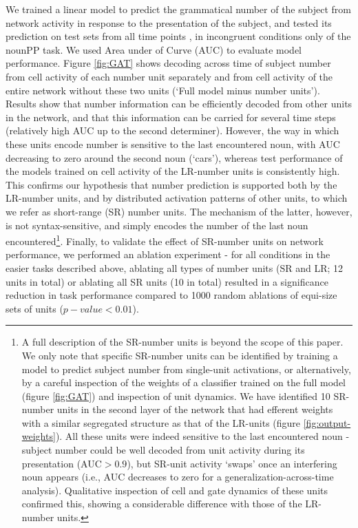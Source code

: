 We trained a linear model to predict the grammatical number of the
subject from network activity in response to the presentation of the
subject, and tested its prediction on test sets from all time points
, in incongruent conditions
only of the nounPP task. We used Area under of Curve (AUC) to evaluate model
performance. Figure \ref{fig:GAT} shows decoding across time of
subject number from cell activity of each number unit separately and
from cell activity of the entire network without these two units
(`Full model minus number units'). Results show that number
information can be efficiently decoded from other units in the
network, and that this information can be carried for several time
steps (relatively high AUC up to the second determiner). However, the
way in which these units encode number is sensitive to the last
encountered noun, with AUC decreasing to zero around the second noun
(`cars'), whereas test performance of the models trained on cell activity of the LR-number units is consistently high. This confirms our
hypothesis that number prediction is supported both by the LR-number
units, and by distributed activation patterns of other units, to which we refer as short-range (SR) number units. The
mechanism of the latter, however, is not syntax-sensitive, and simply encodes
the number of the last noun encountered\footnote{A full description of the SR-number units is beyond the scope of this paper. We only note that specific SR-number units can be identified by training a model to predict subject number from single-unit activations, or alternatively, by a careful inspection of the weights of a classifier trained on the full model (figure \ref{fig:GAT}) and inspection of unit dynamics. We have identified 10 SR-number units in the second layer of the network that had efferent weights with a similar segregated structure as that of the LR-units (figure \ref{fig:output-weights}). All these units were indeed sensitive to the last encountered noun - subject number could be well decoded from unit activity during its presentation (AUC$>0.9$), but SR-unit activity `swaps' once an interfering noun appears (i.e., AUC decreases to zero for a generalization-across-time analysis). Qualitative inspection of cell and gate dynamics of these units confirmed this, showing a considerable difference with those of the LR-number units.}. Finally, to validate the effect of SR-number units on network performance, we performed an ablation experiment - for all conditions in the easier tasks described above, ablating all types of number units (SR and LR; 12 units in total) or ablating all SR units (10 in total) resulted in a significance reduction in task performance compared to 1000 random ablations of equi-size sets of units ($p-value<0.01$).

